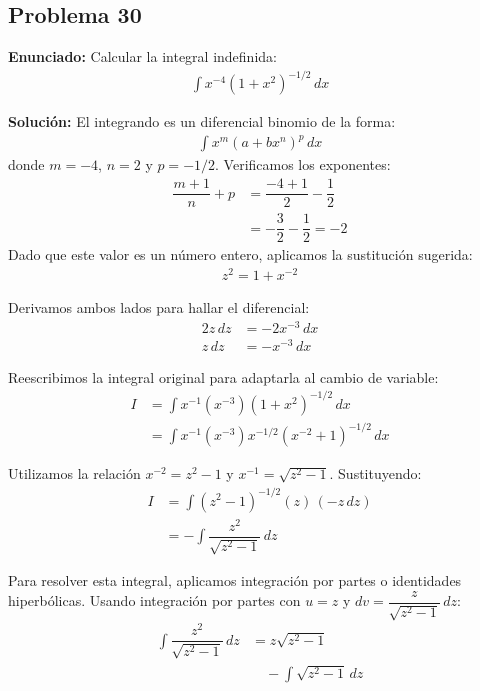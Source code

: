 \subsection*{Problema 30}

\textbf{Enunciado:}
Calcular la integral indefinida:
\begin{align*}
\int x^{-4} (1 + x^2)^{-1/2} \, dx
\end{align*}

\textbf{Solución:}
El integrando es un diferencial binomio de la forma:
\begin{align*}
\int x^m (a + b x^n)^p \, dx
\end{align*}
donde $m = -4$, $n = 2$ y $p = -1/2$. Verificamos los exponentes:
\begin{align*}
\dfrac{m + 1}{n} + p &= \dfrac{-4 + 1}{2} - \dfrac{1}{2} \\
&= -\dfrac{3}{2} - \dfrac{1}{2} = -2
\end{align*}
Dado que este valor es un número entero, aplicamos la sustitución sugerida:
\begin{align*}
z^2 = 1 + x^{-2}
\end{align*}

Derivamos ambos lados para hallar el diferencial:
\begin{align*}
2z \, dz &= -2x^{-3} \, dx \\
z \, dz &= -x^{-3} \, dx
\end{align*}

Reescribimos la integral original para adaptarla al cambio de variable:
\begin{align*}
I &= \int x^{-1} (x^{-3}) (1 + x^2)^{-1/2} \, dx \\
&= \int x^{-1} (x^{-3}) x^{-1/2} (x^{-2} + 1)^{-1/2} \, dx
\end{align*}

Utilizamos la relación $x^{-2} = z^2 - 1$ y $x^{-1} = \sqrt{z^2 - 1}$. Sustituyendo:
\begin{align*}
I &= \int (z^2 - 1)^{-1/2} (z) \, (-z \, dz) \\
&= -\int \dfrac{z^2}{\sqrt{z^2 - 1}} \, dz
\end{align*}

Para resolver esta integral, aplicamos integración por partes o identidades hiperbólicas. Usando integración por partes con $u = z$ y $dv = \dfrac{z}{\sqrt{z^2 - 1}} \, dz$:
\begin{align*}
\int \dfrac{z^2}{\sqrt{z^2 - 1}} \, dz &= z \sqrt{z^2 - 1} \\
&\quad - \int \sqrt{z^2 - 1} \, dz
\end{align*}


